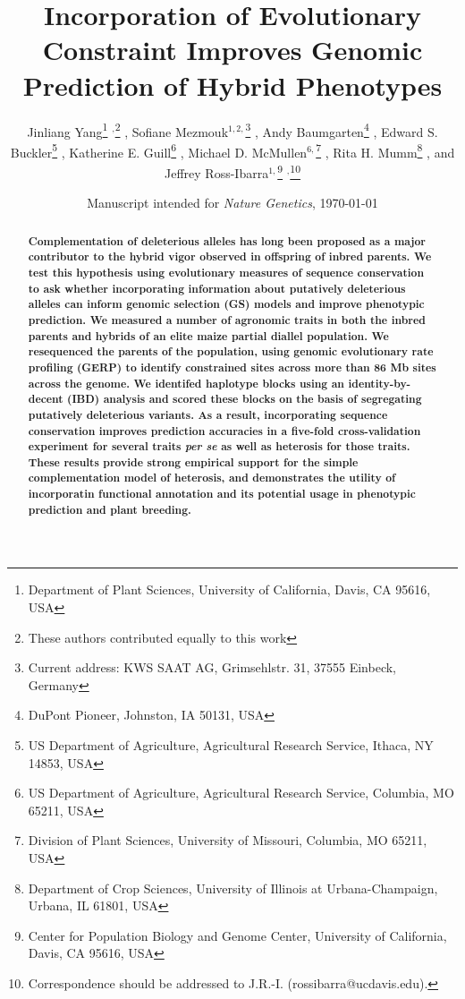 \documentclass[twoside,twocolumn, letterpaper]{article}
\title{Incorporation of Evolutionary Constraint Improves Genomic Prediction of Hybrid Phenotypes}
\author{
Jinliang Yang\thanks{Department of Plant Sciences, University of California, Davis, CA 95616, USA} $^,$\thanks{These authors contributed equally to this work} \hspace{0.5mm}, 
Sofiane Mezmouk$^{1,2,}$\thanks{Current address: KWS SAAT AG, Grimsehlstr. 31, 37555 Einbeck, Germany} \hspace{0.5mm}, 
Andy Baumgarten\thanks{DuPont Pioneer, Johnston, IA 50131, USA} \hspace{0.5mm}, 
Edward S. Buckler\thanks{US Department of Agriculture, Agricultural Research Service, Ithaca, NY 14853, USA} \hspace{0.5mm}, 
Katherine E. Guill\thanks{US Department of Agriculture, Agricultural Research Service, Columbia, MO 65211, USA} \hspace{0.5mm},
Michael D. McMullen$^{6,}$\thanks{Division of Plant Sciences, University of Missouri, Columbia, MO 65211, USA} \hspace{0.5mm},
Rita H. Mumm\thanks{Department of Crop Sciences, University of Illinois at Urbana-Champaign, Urbana, IL 61801, USA} \hspace{0.5mm},
and Jeffrey Ross-Ibarra$^{1,}$\thanks{Center for Population Biology and Genome Center, University of California, Davis, CA 95616, USA} $^,$\thanks{Correspondence should be addressed to J.R.-I. (rossibarra@ucdavis.edu).}\hspace{0.5mm}
}
\date{\small Manuscript intended for \emph{Nature Genetics}, \today}
\begin{document}
 
\maketitle

\begin{abstract}
\noindent \bf
\noindent
Complementation of deleterious alleles has long been proposed as a major contributor to the hybrid vigor observed in offspring of inbred parents. 
We test this hypothesis using evolutionary measures of sequence conservation to ask whether incorporating information about putatively deleterious alleles can inform genomic selection (GS) models and improve phenotypic prediction.
We measured a number of agronomic traits in both the inbred parents and hybrids of an elite maize partial diallel population. 
We resequenced the parents of the population, using genomic evolutionary rate profiling (GERP) to identify constrained sites across more than 86 Mb sites across the genome.  
We identifed haplotype blocks using an identity-by-decent (IBD) analysis and scored these blocks on the basis of segregating putatively deleterious variants. 
As a result, incorporating sequence conservation improves prediction accuracies in a five-fold cross-validation experiment for several traits \emph{per se} as well as heterosis for those traits. 
These results provide strong empirical support for the simple complementation model of heterosis, and demonstrates the utility of incorporatin functional annotation and its potential usage in phenotypic prediction and plant breeding. 

\end{abstract}

\vspace{6mm}




\noindent %
\end{document}
